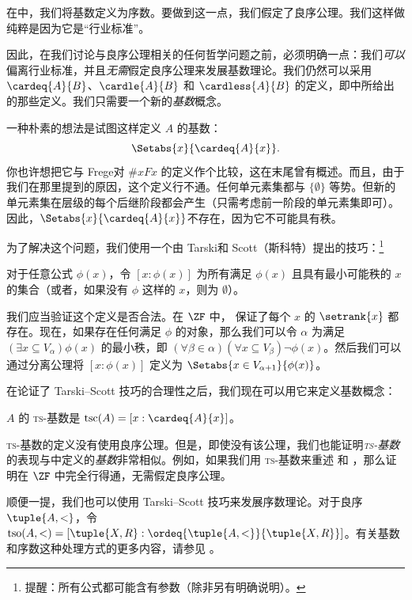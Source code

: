 \documentclass[../../../include/open-logic-section]{subfiles}
\begin{document}

在中，我们将基数定义为序数。要做到这一点，我们假定了良序公理。我们这样做纯粹是因为它是“行业标准”。

因此，在我们讨论与良序公理相关的任何哲学问题之前，必须明确一点：我们\emph{可以}偏离行业标准，并且\emph{无需}假定良序公理来发展基数理论。我们仍然可以采用 $\cardeq{A}{B}$、$\cardle{A}{B}$ 和 $\cardless{A}{B}$ 的定义，即中所给出的那些定义。我们只需要一个新的\emph{基数}概念。

一种朴素的想法是试图这样定义 $A$ 的基数：\[
	\Setabs{x}{\cardeq{A}{x}}.
\]
你也许想把它与 Frege对 $\# x Fx$ 的定义作个比较，这在末尾曾有概述。而且，由于我们在那里提到的原因，这个定义行不通。任何单元素集都与 $\{\emptyset\}$ 等势。但新的单元素集在层级的每个后继阶段都会产生（只需考虑前一阶段的单元素集即可）。因此，$\Setabs{x}{\cardeq{A}{x}}$不存在，因为它不可能具有秩。

为了解决这个问题，我们使用一个由 Tarski和 Scott（斯科特）提出的技巧：\footnote{提醒：所有公式都可能含有参数（除非另有明确说明）。}

\begin{defn}
对于任意公式 $\phi(x)$，令
$[ x : \phi(x)] $ 为所有满足 $\phi(x)$ 且具有最小可能秩的 $x$ 的集合（或者，如果没有 $\phi$ 这样的 $x$，则为 $\emptyset$）。
\end{defn}

我们应当验证这个定义是否合法。在 $\ZF$ 中， 保证了每个 $x$ 的 $\setrank{x}$ 都存在。现在，如果存在任何满足 $\phi$ 的对象，那么我们可以令 $\alpha$ 为满足 $(\exists x\subseteq V_\alpha)\phi(x)$ 的最小秩，即 $(\forall \beta
\in \alpha)(\forall x \subseteq V_\beta)\lnot \phi(x)$。然后我们可以通过分离公理将 $[x : \phi(x)]$ 定义为 $\Setabs{x \in
V_{\alpha+1}}{\phi(x)}$。

在论证了 Tarski--Scott 技巧的合理性之后，我们现在可以用它来定义基数概念：

\begin{defn}
$A$ 的 \textsc{ts}-基数是 $\text{tsc}(A) = [x :
\cardeq{A}{x}]$。
\end{defn}

\textsc{ts}-基数的定义没有使用良序公理。但是，即使没有该公理，我们也能证明\emph{\textsc{ts}-基数}的表现与中定义的\emph{基数}非常相似。例如，如果我们用 \textsc{ts}-基数来重述  和 ，那么证明在 $\ZF$ 中完全行得通，无需假定良序公理。

顺便一提，我们也可以使用 Tarski--Scott 技巧来发展序数理论。对于良序 $\tuple{A, <}$，令 $\text{tso}(A, <) = [\tuple{X,
R} : \ordeq{\tuple{A, <}}{\tuple{X, R}}]$。有关基数和序数这种处理方式的更多内容，请参见 \citet[chs.~9--12]{Potter2004}。
\end{document}
